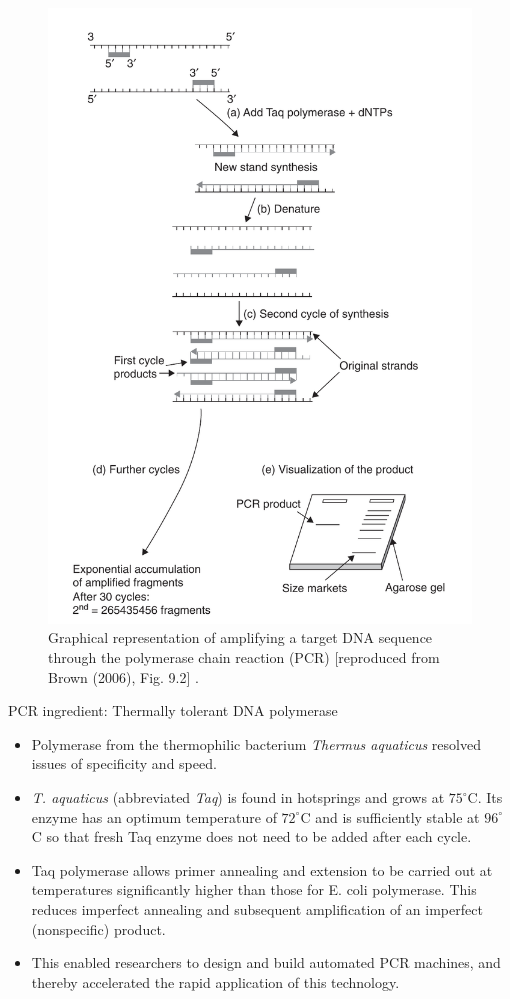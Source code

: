 \documentclass[
  ignorenonframetext,
  aspectratio=169]{beamer}
\providecommand{\tightlist}{%
  \setlength{\itemsep}{0pt}\setlength{\parskip}{0pt}}
\begin{document}
\begin{frame}{}
\protect\hypertarget{section}{}
\begin{figure}
\includegraphics[width=0.38\linewidth]{./../images/pcr_steps} \caption{Graphical representation of amplifying a target DNA sequence through the polymerase chain reaction (PCR) [reproduced from Brown (2006), Fig. 9.2] .}\label{fig:pcr-steps}
\end{figure}
\end{frame}

\begin{frame}{PCR ingredient: Thermally tolerant DNA polymerase}
\protect\hypertarget{pcr-ingredient-thermally-tolerant-dna-polymerase}{}
\begin{itemize}
\tightlist
\item
  Polymerase from the thermophilic bacterium \emph{Thermus aquaticus}
  resolved issues of specificity and speed.
\item
  \emph{T. aquaticus} (abbreviated \emph{Taq}) is found in hotsprings
  and grows at \(75^\circ\)C. Its enzyme has an optimum temperature of
  \(72^\circ\)C and is sufficiently stable at \(96^\circ\)C so that
  fresh Taq enzyme does not need to be added after each cycle.
\item
  Taq polymerase allows primer annealing and extension to be carried out
  at temperatures significantly higher than those for E. coli
  polymerase. This reduces imperfect annealing and subsequent
  amplification of an imperfect (nonspecific) product.
\item
  This enabled researchers to design and build automated PCR machines,
  and thereby accelerated the rapid application of this technology.
\end{itemize}
\end{frame}
\end{document}
